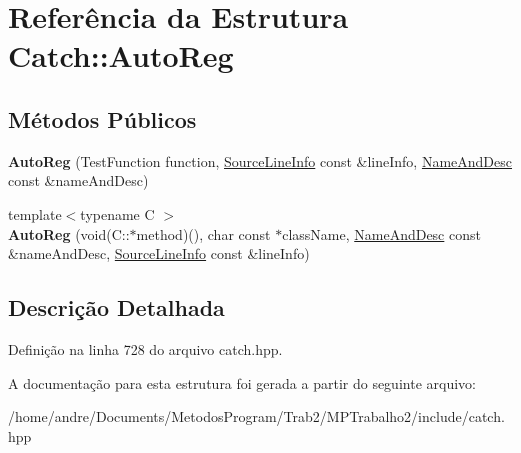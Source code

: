 \hypertarget{structCatch_1_1AutoReg}{}\section{Referência da Estrutura Catch\+:\+:Auto\+Reg}
\label{structCatch_1_1AutoReg}
\subsection*{Métodos Públicos}
\begin{DoxyCompactItemize}
\item 
{\bfseries Auto\+Reg} (Test\+Function function, \hyperlink{structCatch_1_1SourceLineInfo}{Source\+Line\+Info} const \&line\+Info, \hyperlink{structCatch_1_1NameAndDesc}{Name\+And\+Desc} const \&name\+And\+Desc)\hypertarget{structCatch_1_1AutoReg_af224f4568d57b8652474df475a164a8c}{}\label{structCatch_1_1AutoReg_af224f4568d57b8652474df475a164a8c}

\item 
{\footnotesize template$<$typename C $>$ }\\{\bfseries Auto\+Reg} (void(C\+::$\ast$method)(), char const $\ast$class\+Name, \hyperlink{structCatch_1_1NameAndDesc}{Name\+And\+Desc} const \&name\+And\+Desc, \hyperlink{structCatch_1_1SourceLineInfo}{Source\+Line\+Info} const \&line\+Info)\hypertarget{structCatch_1_1AutoReg_a1bf9207fe0a02b46dc0ab1cc03cbe738}{}\label{structCatch_1_1AutoReg_a1bf9207fe0a02b46dc0ab1cc03cbe738}

\end{DoxyCompactItemize}


\subsection{Descrição Detalhada}


Definição na linha 728 do arquivo catch.\+hpp.



A documentação para esta estrutura foi gerada a partir do seguinte arquivo\+:\begin{DoxyCompactItemize}
\item 
/home/andre/\+Documents/\+Metodos\+Program/\+Trab2/\+M\+P\+Trabalho2/include/catch.\+hpp\end{DoxyCompactItemize}
